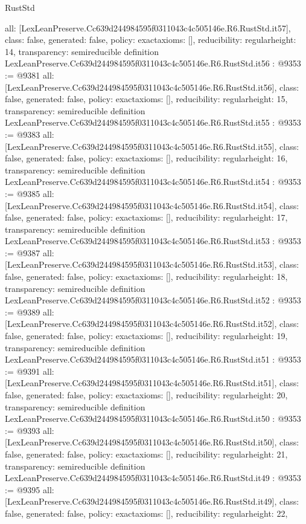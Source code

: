 \begin{lexlean}{RustStd}
\begin{coremodule}
{  all: [LexLeanPreserve.Cc639d244984595f0311043c4c505146e.R6.RustStd.it57],
  class: false,
  generated: false,
  policy: exact{axioms: []},
  reducibility: regular{height: 14},
  transparency: semireducible
}
definition LexLeanPreserve.Cc639d244984595f0311043c4c505146e.R6.RustStd.it56 : @9353 := @9381 {
  all: [LexLeanPreserve.Cc639d244984595f0311043c4c505146e.R6.RustStd.it56],
  class: false,
  generated: false,
  policy: exact{axioms: []},
  reducibility: regular{height: 15},
  transparency: semireducible
}
definition LexLeanPreserve.Cc639d244984595f0311043c4c505146e.R6.RustStd.it55 : @9353 := @9383 {
  all: [LexLeanPreserve.Cc639d244984595f0311043c4c505146e.R6.RustStd.it55],
  class: false,
  generated: false,
  policy: exact{axioms: []},
  reducibility: regular{height: 16},
  transparency: semireducible
}
definition LexLeanPreserve.Cc639d244984595f0311043c4c505146e.R6.RustStd.it54 : @9353 := @9385 {
  all: [LexLeanPreserve.Cc639d244984595f0311043c4c505146e.R6.RustStd.it54],
  class: false,
  generated: false,
  policy: exact{axioms: []},
  reducibility: regular{height: 17},
  transparency: semireducible
}
definition LexLeanPreserve.Cc639d244984595f0311043c4c505146e.R6.RustStd.it53 : @9353 := @9387 {
  all: [LexLeanPreserve.Cc639d244984595f0311043c4c505146e.R6.RustStd.it53],
  class: false,
  generated: false,
  policy: exact{axioms: []},
  reducibility: regular{height: 18},
  transparency: semireducible
}
definition LexLeanPreserve.Cc639d244984595f0311043c4c505146e.R6.RustStd.it52 : @9353 := @9389 {
  all: [LexLeanPreserve.Cc639d244984595f0311043c4c505146e.R6.RustStd.it52],
  class: false,
  generated: false,
  policy: exact{axioms: []},
  reducibility: regular{height: 19},
  transparency: semireducible
}
definition LexLeanPreserve.Cc639d244984595f0311043c4c505146e.R6.RustStd.it51 : @9353 := @9391 {
  all: [LexLeanPreserve.Cc639d244984595f0311043c4c505146e.R6.RustStd.it51],
  class: false,
  generated: false,
  policy: exact{axioms: []},
  reducibility: regular{height: 20},
  transparency: semireducible
}
definition LexLeanPreserve.Cc639d244984595f0311043c4c505146e.R6.RustStd.it50 : @9353 := @9393 {
  all: [LexLeanPreserve.Cc639d244984595f0311043c4c505146e.R6.RustStd.it50],
  class: false,
  generated: false,
  policy: exact{axioms: []},
  reducibility: regular{height: 21},
  transparency: semireducible
}
definition LexLeanPreserve.Cc639d244984595f0311043c4c505146e.R6.RustStd.it49 : @9353 := @9395 {
  all: [LexLeanPreserve.Cc639d244984595f0311043c4c505146e.R6.RustStd.it49],
  class: false,
  generated: false,
  policy: exact{axioms: []},
  reducibility: regular{height: 22},
}
\end{coremodule}
\end{lexlean}
